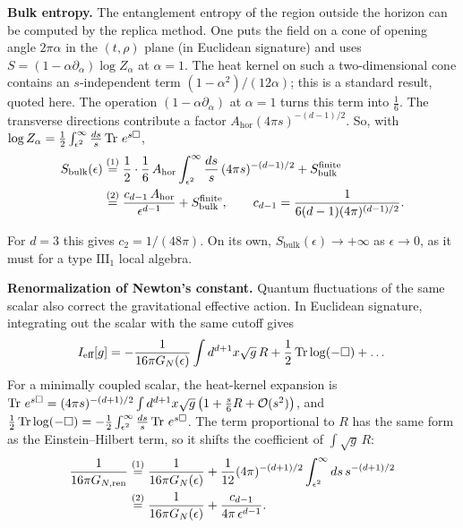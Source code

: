 \textbf{Bulk entropy.} The entanglement entropy of the region outside the horizon can be computed by the replica
method. One puts the field on a cone of opening angle $2\pi\alpha$ in the $(t,\rho)$ plane (in Euclidean
signature) and uses $S=(1-\alpha\partial_\alpha)\log Z_\alpha$ at $\alpha=1$. The heat kernel on such a
two-dimensional cone contains an $s$-independent term $(1-\alpha^2)/(12\alpha)$; this is a standard result,
quoted here. The operation $(1-\alpha\partial_\alpha)$ at $\alpha=1$ turns this term into $\tfrac16$. The
transverse directions contribute a factor $A_{\text{hor}}(4\pi s)^{-(d-1)/2}$. So, with
$\log Z_\alpha=\tfrac12\int_{\epsilon^2}^\infty\frac{ds}{s}\operatorname{Tr}\,e^{s\Box}$,
\begin{align}
S_{\text{bulk}}(\epsilon)
&\overset{(1)}{=} \frac12\cdot\frac16\,A_{\text{hor}}\int_{\epsilon^2}^\infty \frac{ds}{s}\,(4\pi s)^{-(d-1)/2}
  + S_{\text{bulk}}^{\text{finite}} \notag\\
&\overset{(2)}{=} \frac{c_{d-1}\, A_{\text{hor}}}{\epsilon^{d-1}} + S_{\text{bulk}}^{\text{finite}},
\qquad c_{d-1} = \frac{1}{6(d-1)(4\pi)^{(d-1)/2}} . \notag
\end{align}
\quad
{}

For $d=3$ this gives $c_2=1/(48\pi)$. On its own, $S_{\text{bulk}}(\epsilon) \to +\infty$ as $\epsilon \to 0$,
as it must for a type $\mathrm{III}_1$ local algebra.

\textbf{Renormalization of Newton's constant.} Quantum fluctuations of the same scalar also correct the
gravitational effective action. In Euclidean signature, integrating out the scalar with the same cutoff gives
\[
I_{\text{eff}}[g] = -\frac{1}{16\pi G_N(\epsilon)}\int d^{d+1}x \sqrt{g}\, R + \frac{1}{2}\operatorname{Tr}\log(-\Box) + \dots
\]
For a minimally coupled scalar, the heat-kernel expansion is
$\operatorname{Tr}\,e^{s\Box}=(4\pi s)^{-(d+1)/2}\int d^{d+1}x\sqrt g\,\big(1+\tfrac{s}{6}R+\mathcal O(s^2)\big)$, and
$\tfrac12\operatorname{Tr}\log(-\Box)=-\tfrac12\int_{\epsilon^2}^\infty\frac{ds}{s}\operatorname{Tr}\,e^{s\Box}$. The term proportional to
$R$ has the same form as the Einstein--Hilbert term, so it shifts the coefficient of $\int\sqrt g\,R$:
\begin{align}
\frac{1}{16\pi G_{N,\text{ren}}}
&\overset{(1)}{=} \frac{1}{16\pi G_N(\epsilon)} + \frac{1}{12}(4\pi)^{-(d+1)/2}
  \int_{\epsilon^2}^\infty ds\, s^{-(d+1)/2} \notag\\
&\overset{(2)}{=} \frac{1}{16\pi G_N(\epsilon)} + \frac{c_{d-1}}{4\pi\,\epsilon^{d-1}} . \notag
\end{align}
\quad
{}

